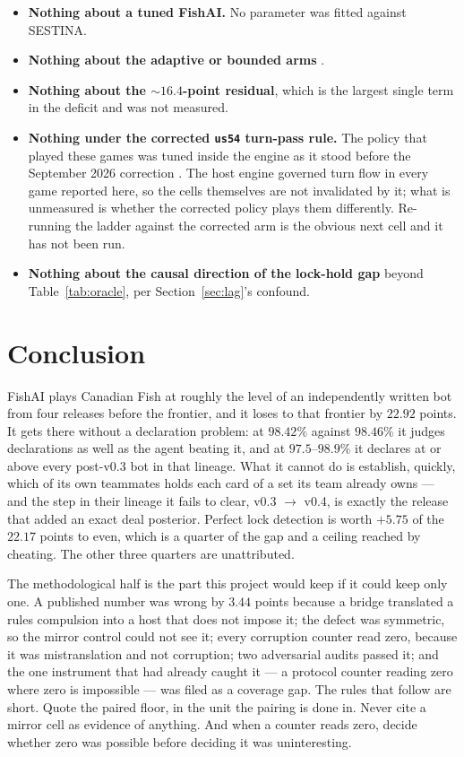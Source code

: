 \documentclass[11pt]{article}
\newcommand{\code}[1]{\texttt{#1}}
\newcommand{\usff}{\code{us54}}
\begin{document}
\begin{itemize}
\item \textbf{Nothing about a tuned FishAI.} No parameter was fitted against SESTINA.
\item \textbf{Nothing about the adaptive or bounded arms} \cite{v10, v15}.
\item \textbf{Nothing about the ${\sim}16.4$-point residual}, which is the largest single term in
the deficit and was not measured.
\item \textbf{Nothing under the corrected \usff{} turn-pass rule.} The policy that played these
games was tuned inside the engine as it stood before the September 2026 correction \cite{rules}.
The host engine governed turn flow in every game reported here, so the cells themselves are not
invalidated by it; what is unmeasured is whether the corrected policy plays them differently.
Re-running the ladder against the corrected arm is the obvious next cell and it has not been run.
\item \textbf{Nothing about the causal direction of the lock-hold gap} beyond
Table~\ref{tab:oracle}, per Section~\ref{sec:lag}'s confound.
\end{itemize}

\section{Conclusion}
\label{sec:conclusion}

FishAI plays Canadian Fish at roughly the level of an independently written bot from four releases
before the frontier, and it loses to that frontier by $22.92$ points. It gets there without a
declaration problem: at $98.42\%$ against $98.46\%$ it judges declarations as well as the agent
beating it, and at $97.5$--$98.9\%$ it declares at or above every post-v0.3 bot in that lineage.
What it cannot do is establish, quickly, which of its own teammates holds each card of a set its
team already owns --- and the step in their lineage it fails to clear, v0.3 $\to$ v0.4, is exactly
the release that added an exact deal posterior. Perfect lock detection is worth $+5.75$ of the
$22.17$ points to even, which is a quarter of the gap and a ceiling reached by cheating. The other
three quarters are unattributed.

The methodological half is the part this project would keep if it could keep only one. A published
number was wrong by $3.44$ points because a bridge translated a rules compulsion into a host that
does not impose it; the defect was symmetric, so the mirror control could not see it; every
corruption counter read zero, because it was mistranslation and not corruption; two adversarial
audits passed it; and the one instrument that had already caught it --- a protocol counter reading
zero where zero is impossible --- was filed as a coverage gap. The rules that follow are short.
Quote the paired floor, in the unit the pairing is done in. Never cite a mirror cell as evidence of
anything. And when a counter reads zero, decide whether zero was possible before deciding it was
uninteresting.
\end{document}
